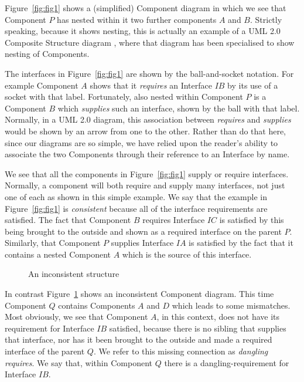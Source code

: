 \documentclass{llncs}
\begin{document}
Figure~\ref{fig:fig1} shows a (simplified) Component diagram in which we see that Component $P$ has nested within it two further components $A$ and $B$. Strictly speaking, because it shows nesting, this is actually an example of a UML 2.0 Composite Structure diagram \cite{UML}, where that diagram has been specialised to show nesting of Components.

The interfaces in Figure~\ref{fig:fig1} are shown by the ball-and-socket notation. For example Component $A$ shows that it {\em requires} an Interface $IB$ by its use of a socket with that label. Fortunately, also nested within Component $P$ is a Component $B$ which {\em supplies} such an interface, shown by the ball with that label. Normally, in a UML 2.0 diagram, this association between {\em requires} and {\em supplies} would be shown by an arrow from one to the other. Rather than do that here, since our diagrams are so simple, we have relied upon the reader's ability to associate the two Components through their reference to an Interface by name.

We see that all the components in Figure~\ref{fig:fig1}  supply or require interfaces. Normally, a component will both require and supply many interfaces, not just one of each as shown in this simple example. We say that the example in Figure~\ref{fig:fig1} is {\em consistent} because all of the interface requirements are satisfied. The fact that Component $B$ requires Interface $IC$ is satisfied by this being brought to the outside and shown as a required interface on the parent $P$. Similarly, that Component $P$ supplies Interface $IA$ is satisfied by the fact that it contains a nested Component $A$ which is the source of this interface.

\begin{figure}[t]
  \centering
   {}
  \caption{An inconsistent structure}
  \label{fig:fig2}
\end{figure}

In contrast Figure~\ref{fig:fig2} shows an inconsistent Component diagram. This time Component $Q$ contains Components $A$ and $D$ which leads to some mismatches. Most obviously, we see that Component $A$, in this context, does not have its requirement for Interface $IB$ satisfied, because there is no sibling that supplies that interface, nor has it been brought to the outside and made a required interface of the parent $Q$. We refer to this missing connection as {\em dangling requires}. We say that, within Component $Q$ there is a dangling-requirement for Interface $IB$.
\end{document}
